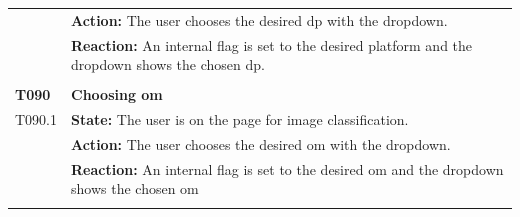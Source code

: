 \documentclass[parskip=full]{scrartcl}
\begin{document}
\begin{tabular}{p{2cm}p{11.4cm}}
& \textbf{Action:} The user chooses the desired \gls{dp} with the dropdown.\\
& \textbf{Reaction:} An internal flag is set to the desired platform and the dropdown shows the chosen \gls{dp}.\\
& \\
\textbf{T090} \hypertarget{T090} & \textbf{Choosing \gls{om}}\\
T090.1 & \textbf{State:} The user is on the page for \gls{image classification}.\\
& \textbf{Action:} The user chooses the desired \gls{om} with the dropdown.\\
& \textbf{Reaction:} An internal flag is set to the desired \gls{om} and the dropdown shows the chosen \gls{om}\\
& \\
\end{tabular}
\newpage
\end{document}

